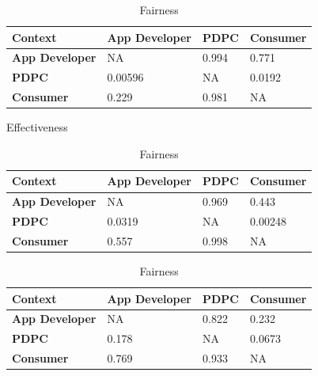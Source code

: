\begin{table}[!ht]
  \begin{subtable}[h]{1\textwidth}
    \centering  
    \begin{tabular}{|l|l|l|l|}
      \hline
      \textbf{Context}       & \textbf{App Developer} & \textbf{PDPC} & \textbf{Consumer} \\ \hline
      \textbf{App Developer} & NA                     & 0.994         & 0.771             \\ \hline
      \textbf{PDPC}          & \cellcolor{red!25}0.00596                & NA            & \cellcolor{red!25}0.0192            \\ \hline
      \textbf{Consumer}      & 0.229                  & 0.981         & NA                \\ \hline
    \end{tabular}
    \caption{Effectiveness}
    \label{tab:effectiveness_after}
  \end{subtable}
  \vfill
  \begin{subtable}[h]{1\textwidth}
    \centering  
    \begin{tabular}{|l|l|l|l|}
      \hline
      \textbf{Context}       & \textbf{App Developer} & \textbf{PDPC} & \textbf{Consumer} \\ \hline
      \textbf{App Developer} & NA                     & 0.969         & 0.443             \\ \hline
      \textbf{PDPC}          & \cellcolor{red!25}0.0319                 & NA            & \cellcolor{red!25}0.00248           \\ \hline
      \textbf{Consumer}      & 0.557                  & 0.998         & NA                \\ \hline
    \end{tabular}
    \caption{Fairness}
    \label{tab:fairness_after}
  \end{subtable}
  \vfill
  \begin{subtable}[h]{1\textwidth}
    \centering
    \begin{tabular}{|l|l|l|l|}
      \hline
      \textbf{Context}       & \textbf{App Developer} & \textbf{PDPC} & \textbf{Consumer} \\ \hline
      \textbf{App Developer} & NA                     & 0.822         & 0.232             \\ \hline
      \textbf{PDPC}          & 0.178                  & NA            & \cellcolor{red!25}0.0673            \\ \hline
      \textbf{Consumer}      & 0.769                  & 0.933         & NA                \\ \hline

\end{tabular}
\end{subtable}
\end{table}
